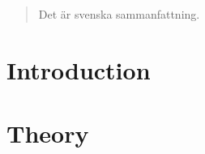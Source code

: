 \documentclass[%
a4paper,							
11pt,								
bibliography=totoc,						
abstracton=true					
]
{scrartcl}
\theoremstyle{plain}
\theoremstyle{definition}
\theoremstyle{remark}
\newcommand{\1}{\mathbbm{1}}
\begin{document}
\newpage
\renewcommand{\abstractname}{Sammanfattning}
\begin{abstract}
    Det är svenska sammanfattning.
\end{abstract}
\newpage
\clearpage
\newpage
{\hypersetup{linkcolor=black}
\tableofcontents
}
\newpage
{}
\pagestyle{scrheadings}



\section{Introduction}\label{sec:Introduction}




% 




\section{Theory}\label{sec:theory}

\end{document}
